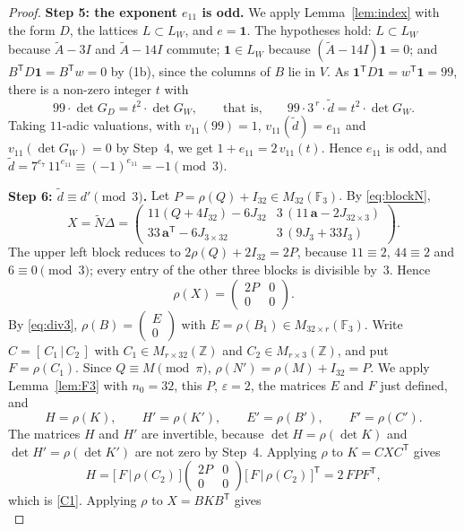 \documentclass[11pt,a4paper]{article}
\theoremstyle{remark}
\newcommand{\ZZ}{\mathbb{Z}}
\newcommand{\FF}{\mathbb{F}}
\newcommand{\one}{\mathbf{1}}
\newcommand{\tp}{\mathsf{T}}
\newcommand{\av}{\mathbf{a}}
\newcommand{\tA}{\widetilde{A}}
\newcommand{\tN}{\widetilde{N}}
\newcommand{\td}{\widetilde{d}}
\begin{document}
\begin{proof}
\medskip\noindent\textbf{Step 5: the exponent $e_{11}$ is odd.}
We apply Lemma~\ref{lem:index} with the form $D$, the lattices $L\subset L_W$, and $e=\one$. The hypotheses hold:
$L\subset L_W$ because $\tA-3I$ and $\tA-14I$ commute; $\one\in L_W$ because $(\tA-14I)\one=0$; and
$B^{\tp}D\one=B^{\tp}w=0$ by (1b), since the columns of $B$ lie in $V$. As $\one^{\tp}D\one=w^{\tp}\one=99$, there is a
non-zero integer $t$ with
\[
99\cdot\det G_D=t^2\cdot\det G_W,\qquad\text{that is,}\qquad 99\cdot3^{\,r}\cdot\td=t^2\cdot\det G_W .
\]
Taking $11$-adic valuations, with $v_{11}(99)=1$, $v_{11}(\td)=e_{11}$ and $v_{11}(\det G_W)=0$ by Step~4, we get
$1+e_{11}=2\,v_{11}(t)$. Hence $e_{11}$ is odd, and
$\td=7^{e_7}\,11^{e_{11}}\equiv(-1)^{e_{11}}=-1\pmod3$.

\medskip\noindent\textbf{Step 6: $\td\equiv d'\pmod3$.}
Let $P=\rho(Q)+I_{32}\in M_{32}(\FF_3)$. By \eqref{eq:blockN},
\[
X=\tN\Delta=\begin{pmatrix}11(Q+4I_{32})-6J_{32}&3\,(11\,\av-2J_{32\times3})\\[2pt]
33\,\av^{\tp}-6J_{3\times32}&3\,(9J_3+33I_3)\end{pmatrix}.
\]
The upper left block reduces to $2\rho(Q)+2I_{32}=2P$, because $11\equiv2$, $44\equiv2$ and $6\equiv0\pmod3$; every
entry of the other three blocks is divisible by~$3$. Hence
\[
\rho(X)=\begin{pmatrix}2P&0\\0&0\end{pmatrix}.
\]
By \eqref{eq:div3}, $\rho(B)=\begin{pmatrix}E\\0\end{pmatrix}$ with $E=\rho(B_1)\in M_{32\times r}(\FF_3)$. Write
$C=[\,C_1\,|\,C_2\,]$ with $C_1\in M_{r\times32}(\ZZ)$ and $C_2\in M_{r\times3}(\ZZ)$, and put $F=\rho(C_1)$. Since
$Q\equiv M\pmod\pi$, $\rho(N')=\rho(M)+I_{32}=P$. We apply Lemma~\ref{lem:F3} with $n_0=32$, this $P$,
$\varepsilon=2$, the matrices $E$ and $F$ just defined, and
\[
H=\rho(K),\qquad H'=\rho(K'),\qquad E'=\rho(B'),\qquad F'=\rho(C').
\]
The matrices $H$ and $H'$ are invertible, because $\det H=\rho(\det K)$ and $\det H'=\rho(\det K')$ are not zero by
Step~4. Applying $\rho$ to $K=CXC^{\tp}$ gives
\[
H=\bigl[\,F\,\big|\,\rho(C_2)\,\bigr]\begin{pmatrix}2P&0\\0&0\end{pmatrix}
\bigl[\,F\,\big|\,\rho(C_2)\,\bigr]^{\tp}=2\,FPF^{\tp},
\]
which is \ref{C1}. Applying $\rho$ to $X=BKB^{\tp}$ gives
\[
\]
\end{proof}
\end{document}
